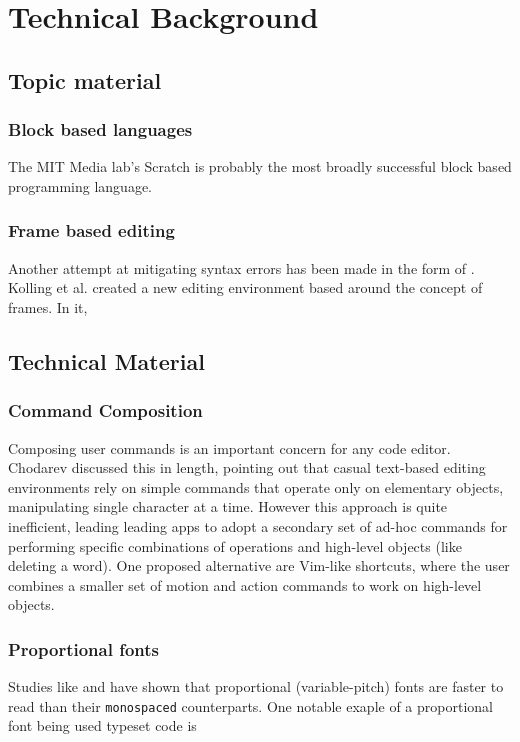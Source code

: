 \chapter{Technical Background}

\section{Topic material}

\subsection{Block based languages}

The MIT Media lab's Scratch \cite{Maloney2010} is probably the most broadly
successful block based programming language.


\subsection{Frame based editing}

Another attempt at mitigating syntax errors has been made in the form of
 \cite{Kolling2017}. Kolling et al. created a new
editing environment based around the concept of frames. In it, 

\section{Technical Material}

\subsection{Command Composition}
Composing user commands is an important concern for any code editor. Chodarev
\cite{Chodarev2016} discussed this in length, pointing out that casual
text-based editing environments rely on simple commands that operate only on
elementary objects, manipulating single character at a time. However this
approach is quite inefficient, leading leading apps to adopt a secondary set of
ad-hoc commands for performing specific combinations of operations and
high-level objects (like deleting a word). One proposed alternative are
Vim-like shortcuts, where the user combines a smaller set of motion and action
commands to work on high-level objects.

\subsection{Proportional fonts}
Studies like \citet{Campbell1981} and \citet{Beldie1983} have shown that
proportional (variable-pitch) fonts are
faster to read than their \texttt{monospaced} counterparts. One notable exaple
of a proportional font being used typeset code is 

